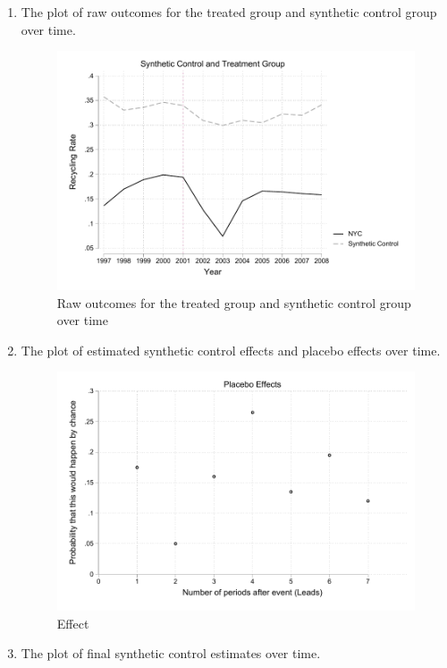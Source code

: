 \documentclass{article}
\begin{document}
\begin{enumerate}
\begin{enumerate}
        \item The plot of raw outcomes for the treated group and synthetic control group over time.

        
            \begin{figure}[ht]
            \centering
            \includegraphics[scale = 0.7]{Q5b_synth.pdf}
            \caption{Raw outcomes for the treated group and synthetic control group over time}
            \label{fig:Q5b_synth}
            \end{figure}

        \item The plot of estimated synthetic control effects and placebo effects over time.
        
            \begin{figure}[ht]
            \centering
            \includegraphics[scale = 0.7]{Q5c_synth.pdf}
            \caption{Effect}
            \label{fig:Q5c_synth}
            \end{figure}
        \item The plot of final synthetic control estimates over time.
        

\end{enumerate}
\end{enumerate}
\end{document}

